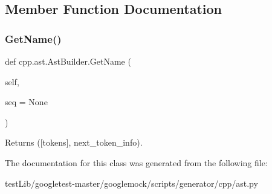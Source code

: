 \subsection{Member Function Documentation}
\mbox{\label{classcpp_1_1ast_1_1AstBuilder_a327957c4228325fc5f64821b047bdc6f}} 
\subsubsection{\texorpdfstring{Get\+Name()}{GetName()}}
{\footnotesize\ttfamily def cpp.\+ast.\+Ast\+Builder.\+Get\+Name (\begin{DoxyParamCaption}\item[{}]{self,  }\item[{}]{seq = {\ttfamily None} }\end{DoxyParamCaption})}

\begin{DoxyVerb}Returns ([tokens], next_token_info).\end{DoxyVerb}
 

The documentation for this class was generated from the following file\+:\begin{DoxyCompactItemize}
\item 
test\+Lib/googletest-\/master/googlemock/scripts/generator/cpp/ast.\+py\end{DoxyCompactItemize}
